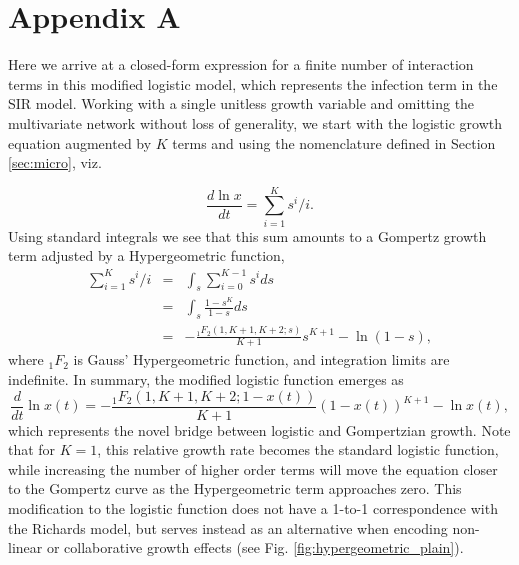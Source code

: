 \documentclass{article}
\begin{document}

\section*{Appendix A}
Here we arrive at a closed-form expression for a finite number of interaction terms in this modified logistic model, which represents the infection term in the SIR model. Working with a single unitless growth variable and omitting the multivariate network without loss of generality, we start with the logistic growth equation augmented by $K$ terms and using the nomenclature defined in Section \ref{sec:micro}, viz. 

\begin{equation}
\frac{d \ln{x}}{dt} = \sum_{i=1}^K s^i/i.
\end{equation}
Using standard integrals we see that this sum amounts to a Gompertz growth term adjusted by a Hypergeometric function,
\begin{eqnarray*}
  \sum_{i=1}^K s^i/i &=& \int_s \sum_{i=0}^{K-1} s^i ds\\
  &=&\int_s \frac{1-s^K}{1-s} ds\\
  &=&- \frac{{}_{1}F_{2}({1,K+1,K+2;s})}{K+1}s^{K+1} - \ln(1-s),
\end{eqnarray*}
where ${}_1F_{2}$ is Gauss' Hypergeometric function, and integration limits are indefinite. In summary, the modified logistic function emerges as
 \begin{equation}
 \label{eq:modLogistic2}
\frac{d}{dt}\ln{x(t)} = - \frac{{}_{1}F_{2}({1,K+1,K+2;1-x(t)})}{K+1}(1-x(t))^{K+1} - \ln{x(t)},
 \end{equation}
 which represents the novel bridge between logistic and Gompertzian growth. Note that for $K=1$, this relative growth rate becomes the standard logistic function, while increasing the number of higher order terms will move the equation closer to the Gompertz curve as the Hypergeometric term approaches zero. This modification to the logistic function does not have a 1-to-1 correspondence with the Richards model, but serves instead as an alternative when encoding non-linear or collaborative growth effects (see Fig. \ref{fig:hypergeometric_plain}). 
\end{document}
